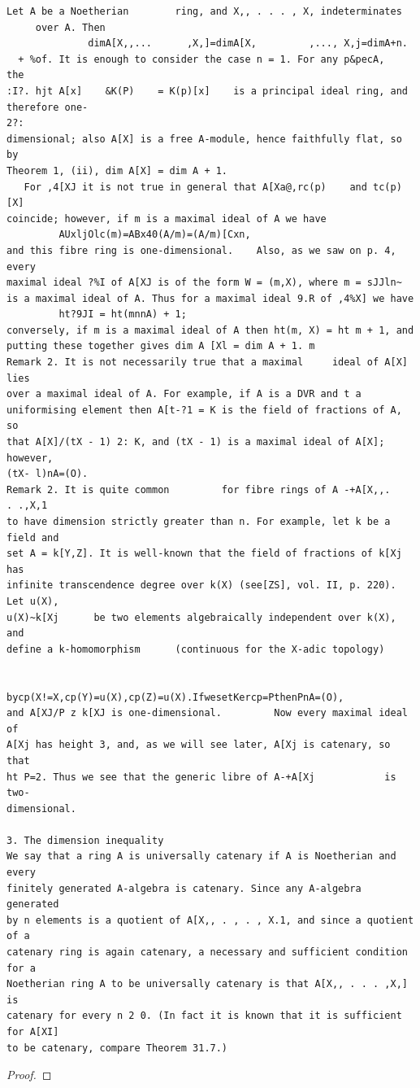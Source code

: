 \begin{theorem}\label{mcrt-auto-theorem-15-4}\uses{}
\begin{verbatim}
Let A be a Noetherian        ring, and X,, . . . , X, indeterminates
     over A. Then
              dimA[X,,...      ,X,]=dimA[X,         ,..., X,j=dimA+n.
  + %of. It is enough to consider the case n = 1. For any p&pecA,                      the
:I?. hjt A[x]    &K(P)    = K(p)[x]    is a principal ideal ring, and therefore one-
2?:
dimensional; also A[X] is a free A-module, hence faithfully flat, so by
Theorem 1, (ii), dim A[X] = dim A + 1.
   For ,4[XJ it is not true in general that A[Xa@,rc(p)    and tc(p)[X]
coincide; however, if m is a maximal ideal of A we have
         AUxljOlc(m)=ABx40(A/m)=(A/m)[Cxn,
and this fibre ring is one-dimensional.    Also, as we saw on p. 4, every
maximal ideal ?%I of A[XJ is of the form W = (m,X), where m = sJJln~
is a maximal ideal of A. Thus for a maximal ideal 9.R of ,4%X] we have
         ht?9JI = ht(mnnA) + 1;
conversely, if m is a maximal ideal of A then ht(m, X) = ht m + 1, and
putting these together gives dim A [Xl = dim A + 1. m
Remark 2. It is not necessarily true that a maximal     ideal of A[X] lies
over a maximal ideal of A. For example, if A is a DVR and t a
uniformising element then A[t-?1 = K is the field of fractions of A, so
that A[X]/(tX - 1) 2: K, and (tX - 1) is a maximal ideal of A[X]; however,
(tX- l)nA=(O).
Remark 2. It is quite common         for fibre rings of A -+A[X,,.    . .,X,1
to have dimension strictly greater than n. For example, let k be a field and
set A = k[Y,Z]. It is well-known that the field of fractions of k[Xj has
infinite transcendence degree over k(X) (see[ZS], vol. II, p. 220). Let u(X),
u(X)~k[Xj      be two elements algebraically independent over k(X), and
define a k-homomorphism      (continuous for the X-adic topology)


bycp(X!=X,cp(Y)=u(X),cp(Z)=u(X).IfwesetKercp=PthenPnA=(O),
and A[XJ/P z k[XJ is one-dimensional.         Now every maximal ideal of
A[Xj has height 3, and, as we will see later, A[Xj is catenary, so that
ht P=2. Thus we see that the generic libre of A-+A[Xj            is two-
dimensional.

3. The dimension inequality
We say that a ring A is universally catenary if A is Noetherian and every
finitely generated A-algebra is catenary. Since any A-algebra generated
by n elements is a quotient of A[X,, . , . , X.1, and since a quotient of a
catenary ring is again catenary, a necessary and sufficient condition for a
Noetherian ring A to be universally catenary is that A[X,, . . . ,X,] is
catenary for every n 2 0. (In fact it is known that it is sufficient for A[XI]
to be catenary, compare Theorem 31.7.)
\end{verbatim}
\end{theorem}
\begin{proof}
\notready
\end{proof}


